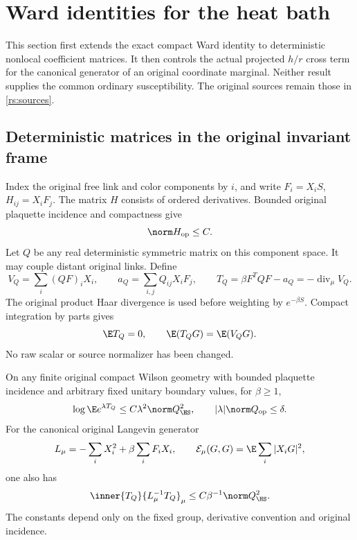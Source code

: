 \section{Ward identities for the heat bath}
\label{rsm:section}

This section first extends the exact compact Ward identity to deterministic nonlocal coefficient matrices. It then controls the actual projected \(h/r\) cross term for the canonical generator of an original coordinate marginal. Neither result supplies the common ordinary susceptibility. The original sources remain those in \eqref{rs:sources}.

\subsection{Deterministic matrices in the original invariant frame}

Index the original free link and color components by \(i\), and write
\(F_i=X_iS\), \(H_{ij}=X_iF_j\). The matrix \(H\) consists of ordered derivatives. Bounded original plaquette incidence and compactness give
\[
 \norm H_{\rm op}\le C.
\]
Let \(Q\) be any real deterministic symmetric matrix on this component space. It may couple distant original links. Define
\begin{equation}
 V_Q=\sum_i(QF)_iX_i,\qquad
 a_Q=\sum_{i,j}Q_{ij}X_iF_j,\qquad
 T_Q=\beta F^TQF-a_Q=-\operatorname{div}_\mu V_Q.
 \label{rsm:matrixward}
\end{equation}
The original product Haar divergence is used before weighting by \(e^{-\beta S}\). Compact integration by parts gives
\begin{equation}
 \E T_Q=0,\qquad
 \E(T_QG)=\E(V_QG).
 \label{rsm:matrixibp}
\end{equation}
No raw scalar or source normalizer has been changed.

\begin{theorem}
\label{rsm:matrixthm}
On any finite original compact Wilson geometry with bounded plaquette incidence and arbitrary fixed unitary boundary values, for \(\beta\ge1\),
\begin{equation}
 \log\E e^{\lambda T_Q}\le C\lambda^2\norm Q_{\HS}^2,
 \qquad |\lambda|\norm Q_{\rm op}\le\delta.
 \label{rsm:matrixmgf}
\end{equation}
For the canonical original Langevin generator
\[
 L_\mu=-\sum_iX_i^2+\beta\sum_iF_iX_i,
 \qquad {\cal E}_\mu(G,G)=\E\sum_i|X_iG|^2,
\]
one also has
\begin{equation}
 \inner{T_Q}{L_\mu^{-1}T_Q}_\mu
 \le C\beta^{-1}\norm Q_{\HS}^2.
 \label{rsm:matrixhinverse}
\end{equation}
The constants depend only on the fixed group, derivative convention and original incidence.
\end{theorem}

